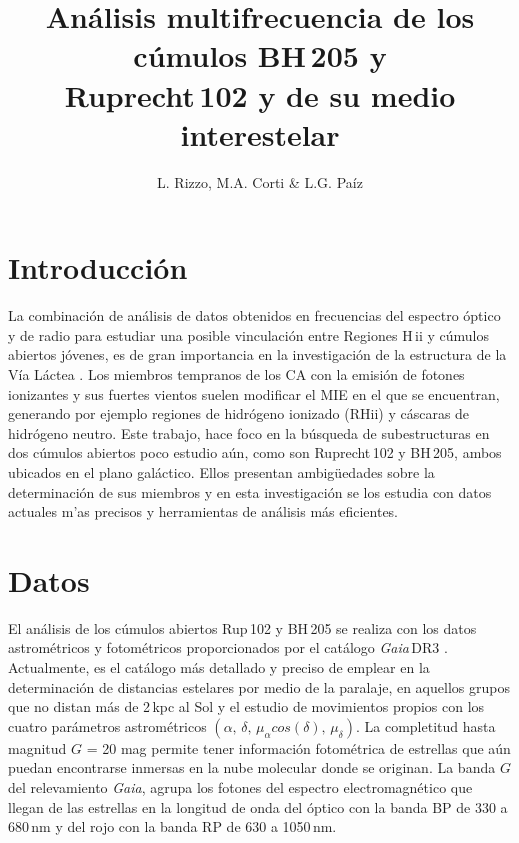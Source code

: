 \documentclass[baaa]{baaa}
\title{An\'alisis multifrecuencia de los c\'umulos BH\,205 y\\ 
Ruprecht\,102 y de su medio interestelar}
\author{
L. Rizzo\inst{1},
M.A. Corti\inst{1,2}
\&
L.G. Paíz\inst{1,3}
}
\institute{
Facultad de Ciencias Astron\'omicas y Geof{\'\i}sicas, UNLP, Argentina\and   
Instituto Argentino de Radioastronom\'ia, CONICET--CICPBA--UNLP, Argentina
\and
Instituto de Astrofísica de La Plata, CONICET--UNLP, Argentina
}
\begin{document}
\maketitle
\section{Introducci\'on}
\label{S_intro}
La combinaci\'on de an\'alisis de datos obtenidos en frecuencias del espectro \'optico y de radio para estudiar una posible vinculaci\'on entre Regiones H\,{\sc ii} y c\'umulos abiertos j\'ovenes, es de gran importancia en la investigaci\'on de la estructura de la V\'ia L\'actea \citep{2023corti,2016corti}. Los miembros tempranos de los CA con la emisi\'on de fotones ionizantes y sus fuertes vientos suelen modificar el MIE en el que se encuentran, generando por ejemplo regiones de hidr\'ogeno ionizado (RH{\sc ii}) y c\'ascaras de hidr\'ogeno neutro. Este trabajo, hace foco en la b\'usqueda de sub\-estructuras en dos c\'umulos abiertos poco estudio a\'un, como son Ruprecht\,102 y BH\,205, ambos ubicados en el plano gal\'actico.
Ellos presentan ambig\"uedades sobre la determinaci\'on de sus miembros y en esta investigaci\'on se los estudia con datos actuales m'as precisos y herramientas de an\'alisis m\'as eficientes. 

\section{Datos}
\label{datos}
El an\'alisis de los c\'umulos abiertos Rup\,102 y BH\,205 se realiza con los datos astrom\'etricos y fotom\'etricos proporcionados por el cat\'alogo \emph{Gaia}\,DR3 \citep{2021g}. Actualmente, es el cat\'alogo m\'as detallado y preciso de emplear en la determinaci\'on de distancias estelares por medio de la paralaje, en aquellos grupos que no distan m\'as de 2\,kpc al Sol y el estudio de movimientos propios con los cuatro par\'ametros astrom\'etricos $(\alpha,\,\delta,\,\mu_{\alpha}cos(\delta),\,\mu_{\delta})$. La completitud hasta magnitud $G$ = 20 mag permite tener informaci\'on fotom\'etrica de estrellas que a\'un puedan encontrarse in\-mersas en la nube molecular donde se originan. La banda $G$ del relevamiento \emph{Gaia}, agrupa los fotones del espectro electromagn\'etico que llegan de las estrellas en la longitud de onda del \'optico con la banda BP de 330 a 680\,nm y del rojo con la banda RP de 630 a 1050\,nm.
\end{document}
